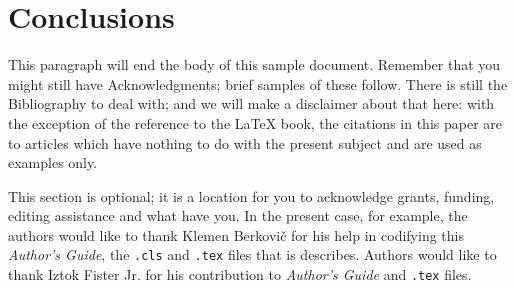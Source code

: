 \documentclass[article,english]{stucosrec}
\newcommand{\latex}{\LaTeX\xspace}
\begin{document}
	\section{Conclusions}
	
	This paragraph will end the body of this sample document.
	Remember that you might still have Acknowledgments; brief samples of these follow.
	There is still the Bibliography to deal with; and we will make a disclaimer about that here: with the exception of the reference to the \latex book, the citations in this paper are to articles which have nothing to do with the present subject and are used as examples only.
	
	\begin{acknowledgment}
		This section is optional; it is a location for you to acknowledge grants, funding, editing assistance and what have you.
		In the present case, for example, the authors would like to thank Klemen Berkovič for his help in codifying this \textit{Author's Guide}, the \texttt{.cls} and \texttt{.tex} files that is describes. Authors would like to thank Iztok Fister Jr. for his contribution to \textit{Author's Guide} and \texttt{.tex} files.
	\end{acknowledgment}

	
	
\end{document}
